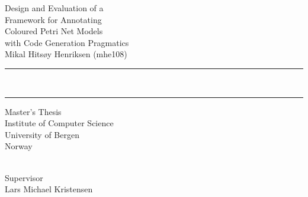 \documentclass[twoside, 11pt, openright]{report}
\newcommand{\clearemptydoublepage}{\newpage{\pagestyle{empty}\cleardoublepage}}
\begin{document}
\lstset{language=CPNML,tabsize=1}

\pagestyle{empty}

\vspace*{\fill}
\begin{flushright}
  {\Huge\sf Design and Evaluation of a}\\[2ex]
  {\Huge\sf Framework for Annotating}\\[2ex]
  {\Huge\sf Coloured Petri Net Models}\\[2ex]
  {\Huge\sf with Code Generation Pragmatics}\\[4ex]
  {\huge\sf Mikal Hitsøy Henriksen (mhe108)} 
\end{flushright}
\noindent\rule{\linewidth}{1mm}\\[-.5ex]
\noindent\rule{\linewidth}{2.5mm}
\vfill
\begin{center}
  {\huge\sf Master's Thesis}\\[\fill]
  {\sf Institute of Computer Science\\University of Bergen\\Norway}
\end{center}
\begin{center}
  {\sf \makeatletter\@date\makeatother\\Supervisor\\Lars Michael Kristensen}
\end{center}
\vspace*{\fill}
\clearemptydoublepage





\clearpage
\tableofcontents
\clearemptydoublepage



\pagestyle{headings}
\setcounter{page}{1}









\appendix

\listoffigures
\lstlistoflistings
\end{document}
